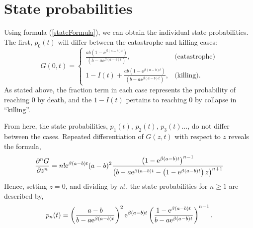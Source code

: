 \section{State probabilities}

Using formula (\ref{stateFormula}), we can obtain the individual state probabilities. The first, $p_0(t)$ will differ between the catastrophe and killing cases: 
$$G(0 , t) = \begin{cases}
\frac{ab(1-\ee^{\beta(a-b) t})  } {  (b-a\ee^{\beta(a-b) t})   }, & \text{(catastrophe)}\\
1 - I(t) + \frac{ab(1-\ee^{\beta(a-b) t})  } {  (b-a\ee^{\beta(a-b) t})   }, & \text{(killing).}
\end{cases}$$
As stated above, the fraction term in each case represents the probability of reaching 0 by death, and the $1-I(t)$ pertains to reaching 0 by collapse in ``killing''.\par 
From here, the state probabilities, $p_1(t)$, $p_2(t)$, $p_3(t)\dots$, do not differ between the cases. Repeated differentiation of $G(z,t)$ with respect to $z$ reveals the formula,
$$\frac{\partial^n G}{\partial z^n} =n! {\rm e}^{\beta(a-b)t}(a-b)^2  \frac{\left(1-{\rm e}^{\beta(a-b)t}\right)^ {n-1} }{\left( b - a{\rm e}^{\beta(a-b)t} - \left(1-{\rm e}^{\beta(a-b)t}\right) z\right) ^ {n+1}} $$
Hence, setting $z=0$, and dividing by $n!$, the state probabilities for $n\geq1$ are described by,
\begin{equation}
\label{stateprob}
p_n(t) =\left( \frac{ a-b }{{b - a{\rm e}^{\beta(a-b)t}}}\right)^2 {\rm e}^{\beta(a-b)t} \left(\frac{{1-{\rm e}^{\beta(a-b)t}}}{{b - a{\rm e}^{\beta(a-b)t}} } \right)^{n-1}.
\end{equation}
